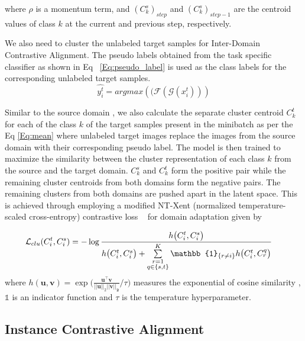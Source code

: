 where $\rho$ is a momentum term, and $(C_k^s)_{step} $ and $(C_k^s)_{step-1}$ are the centroid values of class $k$ at the current and previous step, respectively.

We also need to cluster the unlabeled target samples for Inter-Domain Contrastive Alignment. The pseudo labels obtained from the task specific classifier as shown in Eq ~\eqref{Eq:pseudo_label} is used as the class labels for the corresponding unlabeled target samples.
\begin{equation}
    \hat{y_i^t} = argmax (\mathcal(\mathcal{F}(\mathcal{G}(x_i^t)))
    \label{Eq:pseudo_label}
\end{equation}

Similar to the source domain , we also calculate the separate cluster centroid $C_k^t$ for each of the class $k$ of the target samples present in the minibatch as per the Eq \eqref{Eq:mean} where unlabeled target images replace the images from the source domain with their corresponding pseudo label.
The model is then trained to maximize the similarity between the cluster representation of each class $k$ from the source and the target domain. $C_k^s$ and $C_k^t$ form the positive pair while the remaining cluster centroids from both domains form the negative pairs. The remaining clusters from both domains are pushed apart in the latent space. This is achieved through employing a modified  NT-Xent  (normalized temperature-scaled cross-entropy) contrastive  loss ~\cite{Chen2020ASF,Oord2018RepresentationLW,Singh_2021_CVPR, Liu2021DomainAF} for domain adaptation given by 

\begin{equation}
\label{eq:inter-domain contrastive alignment}
\hspace{-4mm}
\mathcal{L}_{clu}(C_i^t, C_i^s)= -\log\frac{h\big(C_i^t, C_i^s\big)}{h\big(C_i^t,C_i^s\big)+\sum\limits_{\substack{r=1\\q\in\{s,t\}}}^{K}\mathbb{1}_{\{r \neq i\}}h\big(C_i^t,C_r^q\big)}
\end{equation}
\vspace{2mm}
where $h(\mathbf{u},\mathbf{v}) = \exp\big(\frac{\mathbf{u}^\top \mathbf{v}}{||\mathbf{u}||_2||\mathbf{v||_2}}/\tau\big)$
measures the exponential of cosine similarity  , $\mathbb{1}$ is an indicator function and $\tau$ is the temperature hyperparameter.

\subsection{Instance Contrastive Alignment}


